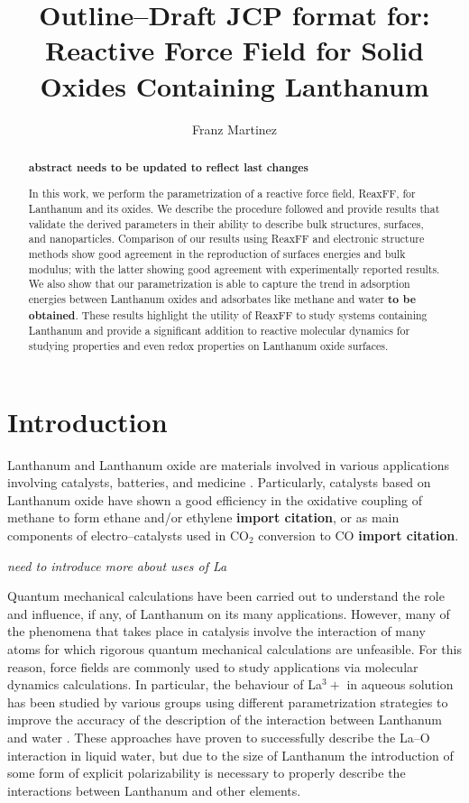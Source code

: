 \documentclass[journal=jpcafh,manuscript=article]{achemso}
\author{Franz Martinez}
\affiliation{Schulich School of Engineering, University of Calgary, Calgary, Alberta, Canada}
\title{Outline--Draft JCP format for: Reactive Force Field for Solid Oxides Containing Lanthanum}
\begin{document}
\begin{abstract}
\textbf{abstract needs to be updated to reflect last changes}


In this work, we perform the parametrization of a reactive force field, ReaxFF, for Lanthanum and its oxides.
We describe the procedure followed and provide results that validate the derived parameters in their ability to describe bulk structures, surfaces, and nanoparticles.
Comparison of our results using ReaxFF and electronic structure methods show good agreement in the reproduction of surfaces energies and bulk modulus; with the latter showing good agreement with experimentally reported results.
We also show that our parametrization is able to capture the trend in adsorption energies between Lanthanum oxides and adsorbates like methane and water \textbf{to be obtained}.
These results highlight the utility of ReaxFF to study systems containing Lanthanum and provide a significant addition to reactive molecular dynamics for studying properties and even redox properties on Lanthanum oxide surfaces.

\end{abstract}


\section{Introduction}

Lanthanum and Lanthanum oxide are materials involved in various applications involving catalysts, batteries, and medicine \cite{atwood2013rare,he2013preparation}.
Particularly, catalysts based on Lanthanum oxide have shown a good efficiency in the oxidative coupling of methane to form ethane and/or ethylene \textbf{import citation}, or as main components of electro--catalysts used in CO$_2$ conversion to CO \textbf{import citation}.

\emph{need to introduce more about uses of La}

Quantum mechanical calculations have been carried out to understand the role and influence, if any, of Lanthanum on its many applications.
However, many of the phenomena that takes place in catalysis involve the interaction of many atoms for which rigorous quantum mechanical calculations are unfeasible.
For this reason, force fields are commonly used to study applications via molecular dynamics calculations.
In particular, the behaviour of La$^3+$ in aqueous solution has been studied by various groups using different parametrization strategies to improve the accuracy of the description of the interaction between Lanthanum and water \cite{duvail2007pair}.
These approaches have proven to successfully describe the La--O interaction in liquid water, but due to the size of Lanthanum the introduction of some form of explicit polarizability is necessary to properly describe the interactions between Lanthanum and other elements.
\end{document}

